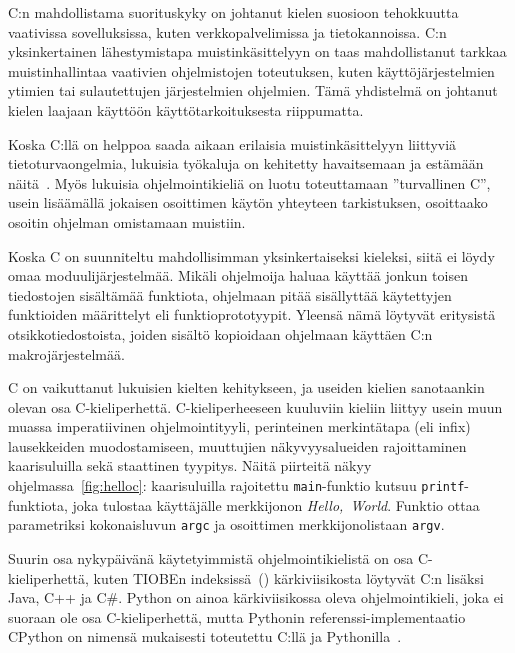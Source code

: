 C:n mahdollistama suorituskyky on johtanut kielen suosioon tehokkuutta
vaativissa sovelluksissa, kuten verkkopalvelimissa ja tietokannoissa. C:n
yksinkertainen lähestymistapa muistinkäsittelyyn on taas mahdollistanut tarkkaa
muistinhallintaa vaativien ohjelmistojen toteutuksen, kuten käyttöjärjestelmien
ytimien tai sulautettujen järjestelmien ohjelmien. Tämä yhdistelmä on johtanut
kielen laajaan käyttöön käyttötarkoituksesta riippumatta.

Koska C:llä on helppoa saada aikaan erilaisia muistinkäsittelyyn liittyviä
tietoturvaongelmia, lukuisia työkaluja on kehitetty havaitsemaan ja estämään
näitä~\citep[mm.][]{valgrind,asan}. Myös lukuisia ohjelmointikieliä on luotu
toteuttamaan ''turvallinen C'', usein lisäämällä jokaisen osoittimen käytön
yhteyteen tarkistuksen, osoittaako osoitin ohjelman omistamaan muistiin.


Koska C on suunniteltu mahdollisimman yksinkertaiseksi kieleksi, siitä ei löydy
omaa moduulijärjestelmää. Mikäli ohjelmoija haluaa käyttää jonkun toisen
tiedostojen sisältämää funktiota, ohjelmaan pitää sisällyttää käytettyjen
funktioiden määrittelyt eli funktioprototyypit. Yleensä nämä löytyvät
eritysistä otsikkotiedostoista, joiden sisältö kopioidaan ohjelmaan käyttäen
C:n makrojärjestelmää.

C on vaikuttanut lukuisien kielten kehitykseen, ja useiden kielien sanotaankin
olevan osa C-kieliperhettä. C-kieliperheeseen kuuluviin kieliin liittyy usein
muun muassa imperatiivinen ohjelmointityyli, perinteinen merkintätapa (eli
infix) lausekkeiden muodostamiseen, muuttujien näkyvyysalueiden rajoittaminen
kaarisuluilla sekä staattinen tyypitys. Näitä piirteitä näkyy
ohjelmassa~\ref{fig:helloc}: kaarisuluilla rajoitettu \texttt{main}-funktio
kutsuu \texttt{printf}-funktiota, joka tulostaa käyttäjälle merkkijonon
\emph{Hello,~World}. Funktio ottaa parametriksi kokonaisluvun \texttt{argc} ja
osoittimen merkkijonolistaan \texttt{argv}.

Suurin osa nykypäivänä käytetyimmistä ohjelmointikielistä on osa
C-kieliperhettä, kuten TIOBEn indeksissä~(\citeyear{tiobe}) kärkiviisikosta
löytyvät C:n lisäksi Java, C++ ja C\#. Python on ainoa kärkiviisikossa oleva
ohjelmointikieli, joka ei suoraan ole osa C-kieliperhettä, mutta Pythonin
referenssi-implementaatio CPython on nimensä mukaisesti toteutettu
C:llä ja Pythonilla~\citep{cpython}.


